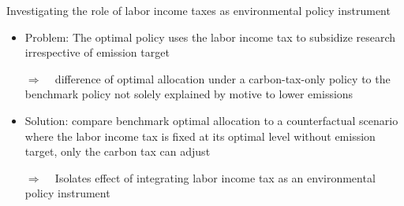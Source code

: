 \documentclass[11pt,aspectratio=169]{beamer}
\newcommand{\ar}{$\Rightarrow$ \ }
\begin{document}
\begin{frame}{Investigating the role of labor income taxes as environmental policy instrument}
	
	
	\begin{itemize}[<+-| alert@+>]
		\item 	{Problem: The optimal policy uses the labor income tax to subsidize research irrespective of emission target}
		\vspace{3mm}
		\item[\ar] difference of optimal allocation under a carbon-tax-only policy to the benchmark policy not solely explained by motive to lower emissions %
		\vspace{3mm}
		\item Solution: compare benchmark optimal allocation to a counterfactual scenario where the labor income tax is fixed at its optimal level without emission target, only the carbon tax can adjust
		\vspace{3mm}
		\item[\ar] Isolates effect of integrating labor income tax as an environmental policy instrument 
	\end{itemize}
\end{frame}
\end{document}
